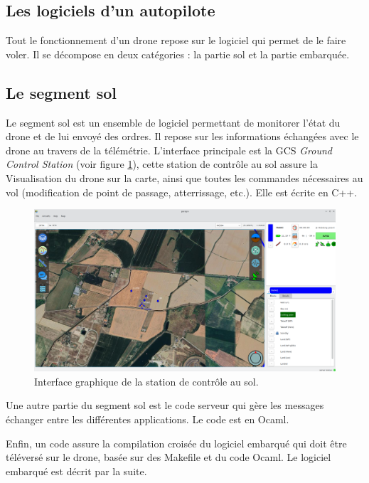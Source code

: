  \subsection{Les logiciels d'un autopilote}
 \label{sec:logiciel}
 Tout le fonctionnement d'un drone repose sur le logiciel qui permet de le faire voler. Il se décompose en deux catégories : la partie sol et la partie embarquée.

 \subsection{Le segment sol}
 {\color{red}
Le segment sol est un ensemble de logiciel permettant de monitorer l'état du drone et de lui envoyé des ordres. Il repose sur les informations échangées avec le drone au travers de la télémétrie. L'interface principale est la GCS \textit{Ground Control Station} (voir figure \ref{fig:GCS}), cette station de contrôle au sol assure la Visualisation du drone sur la carte, ainsi que toutes les commandes nécessaires au vol (modification de point de passage, atterrissage, etc.). Elle est écrite en C++.

\begin{figure}[ht!]
    \centerline{
    \includegraphics[trim=0cm 0cm 0cm 0cm,clip,width=0.8\columnwidth]{figures/GCS.png}}
    \caption{Interface graphique de la station de contrôle au sol.}
    \label{fig:GCS}
\end{figure}


Une autre partie du segment sol est le code serveur qui gère les messages échanger entre les différentes applications. Le code est en Ocaml.

Enfin, un code assure la compilation croisée du logiciel embarqué qui doit être téléversé sur le drone, basée sur des Makefile et du code Ocaml. Le logiciel embarqué est décrit par la suite.

}
